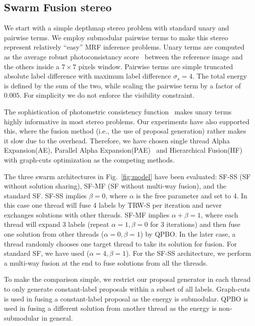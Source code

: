 \subsection{Swarm Fusion stereo}
We start with a simple depthmap stereo problem with standard unary and
pairwise terms. We employ submodular pairwise terms to make this
stereo represent relatively ``easy'' MRF inference problems.
%
Unary terms are computed as the average robust photoconsistancy
score~\cite{second_order_stereo} between the reference image and the others
inside a $7\times 7$ pixels window.  Pairwise terms are simple
truncated absolute label difference with maximum label difference
$\sigma_s=4$. The total energy is defined by the sum of the two, while
scaling the pairwise term by a factor of $0.005$. For simplicity we
do not enforce the visibility constraint.

%


\noindent The sophistication of photometric consistency
function~\cite{mvs_furukawa_survey} makes unary terms highly informative
in most stereo problems.  Our experiments have also supported this,
where the fusion method (i.e., the use of proposal generation) rather
makes it slow due to the overhead.
Therefore, we have chosen single thread Alpha Expansion(AE), Parallel
Alpha
Expansion(PAE)~\cite{fusion_moves_for_markov_random_field_optimization}
and Hierarchical
Fusion(HF)~\cite{delong_hierarchical_fusion,olga_hierarchical_alpha_expansion}
with graph-cuts optimization as the competing methods.




\noindent The three swarm architectures in Fig.~\ref{fig:model} have
been evaluated: SF-SS (SF without solution sharing), SF-MF (SF without
multi-way fusion), and the standard SF.
%
SF-SS implies $\beta=0$, where $\alpha$ is the free parameter and set to
4. In this case one thread will fuse 4 labels by TRW-S per iteration and
never exchanges solutions with other threads. SF-MF implies
$\alpha+\beta=1$, where each thread will expand 3 labels (repeat
$\alpha=1, \beta=0$ for 3 iterations) and then fuse one solution from
other threads ($\alpha=0, \beta=1$) by QPBO. In the later case, a thread
randomly chooses one target thread to take its solution for fusion. For standard SF,
we have used ($\alpha=4, \beta=1$). For the SF-SS architecture, we
perform a multi-way fusion at the end to fuse solutions from all the threads.

%
%
%
%
To make the comparison simple, we restrict our proposal generator
in each thread to only generate constant-label proposals within a
subset of all labels. Graph-cuts is used in fusing a constant-label
proposal as the energy is submodular. QPBO is used in fusing a
different solution from another thread as the energy is
non-submodular in general.
%
